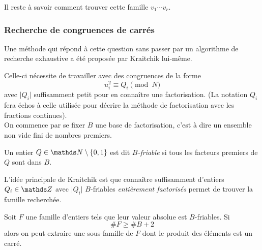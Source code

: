 Il reste à savoir comment trouver cette famille $v_1 \cdots v_r$.\\

\subsubsection{Recherche de congruences de carrés}

Une méthode qui répond à cette question sans passer par un algorithme de recherche
exhaustive a été proposée par Kraitchik lui-même. \\ 


Celle-ci nécessite de travailler avec des congruences de la forme 
\[u_i^2 \equiv Q_i \pmod{N}\] avec $\lvert Q_i \rvert$ suffisamment petit pour 
en connaître une factorisation. (La notation $Q_i$ fera échos à celle utilisée 
pour décrire la méthode de factorisation avec les fractions continues). \\

On commence par se fixer $B$ une base de factorisation, c'est à dire un 
ensemble non vide fini de nombres premiers.

\begin{definition}
	Un entier $Q\in \N\setminus \{0, 1\}$ est dit \emph{$B$-friable} si tous
	les facteurs premiers de $Q$ sont dans $B$.
\end{definition}

L'idée principale de Kraitchik  est que connaître suffisamment
d'entiers $Q_i \in \Z$ avec $ \lvert Q_i \rvert$ $B$-friables 
\emph{entièrement factorisés} permet de trouver la famille recherchée.

\begin{proposition}
	Soit $F$ une famille d'entiers tels que leur valeur absolue est $B$-friables.
    Si \[\# F \geqslant \# B + 2\] alors on peut extraire une sous-famille de
    $F$ dont le produit des éléments est un carré.
\end{proposition}

